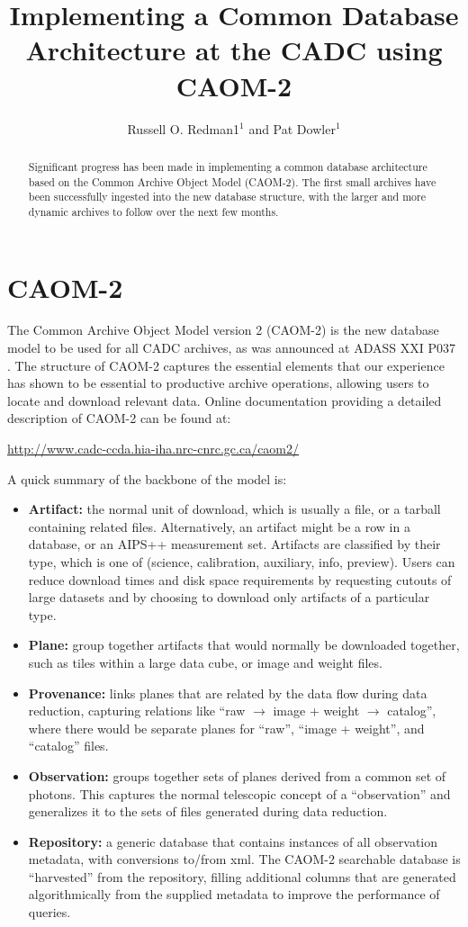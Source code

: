 \documentclass[11pt,twoside]{article}
\begin{document}
\title{Implementing a Common Database Architecture at the CADC using CAOM-2}
\author{Russell O. Redman1$^1$ and Pat Dowler$^1$}

\begin{abstract}
Significant progress has been made in implementing a common database architecture based on the Common Archive Object Model (CAOM-2). The first small archives have been successfully ingested into the new database structure, with the larger and more dynamic archives to follow over the next few months. 
\end{abstract}

\section{CAOM-2}
The Common Archive Object Model version 2 (CAOM-2) is the new database model to be used for all CADC archives, as was announced at ADASS XXI P037 \citet{P037_adassxxi}.  The structure of CAOM-2 captures the essential elements that our experience has shown to be essential to productive archive operations, allowing users to locate and download relevant data.  Online documentation providing a detailed description of CAOM-2 can be found at:
\begin{center}
 \url{http://www.cadc-ccda.hia-iha.nrc-cnrc.gc.ca/caom2/}
 \end{center}  
A quick summary of the backbone of the model is:
\begin{itemize}
\item {\bf Artifact:} the normal unit of download, which is usually a file, or a tarball containing related files.  Alternatively, an artifact might be a row in a database, or an AIPS++ measurement set.  Artifacts are classified by their type, which is one of (science, calibration, auxiliary, info, preview).  Users can reduce download times and disk space requirements by requesting cutouts of large datasets and by choosing to download only artifacts of a particular type.
\item {\bf Plane:} group together artifacts that would normally be downloaded together, such as tiles within a large data cube, or image and weight files.
\item {\bf Provenance:} links planes that are related by the data flow during data reduction, capturing relations like ``raw $\rightarrow$ image + weight $\rightarrow$ catalog'', where there would be separate planes for ``raw'', ``image + weight'', and ``catalog'' files.
\item {\bf Observation:} groups together sets of planes derived from a common set of photons.  This captures the normal telescopic concept of a ``observation'' and generalizes it to the sets of files generated during data reduction.  
\item {\bf Repository:} a generic database that contains instances of all observation metadata, with conversions to/from xml.  The CAOM-2 searchable database is ``harvested'' from the repository, filling additional columns that are generated algorithmically from the supplied metadata to improve the performance of queries. 
\end{itemize}
\end{document}
